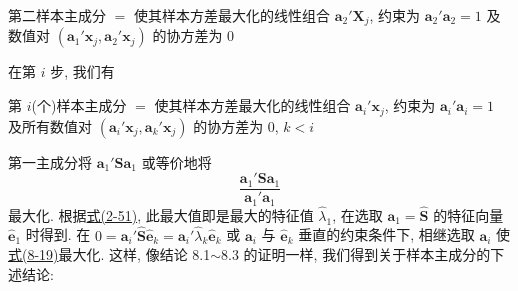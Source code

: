 第二样本主成分 $=$ 使其样本方差最大化的线性组合 $\mathbf{a}_2'\mathbf{X}_j$, 约束为 $\mathbf{a}_2'\mathbf{a}_2=1$ 及数值对 $(\mathbf{a}_1'\mathbf{x}_j,\mathbf{a}_2'\mathbf{x}_j)$ 的协方差为 0

在第 $i$ 步, 我们有

第 $i$(个)样本主成分 $=$ 使其样本方差最大化的线性组合 $\mathbf{a}_i'\mathbf{x}_j$, 约束为 $\mathbf{a}_i'\mathbf{a}_i=1$ 及所有数值对 $(\mathbf{a}_i'\mathbf{x}_j,\mathbf{a}_k'\mathbf{x}_j)$ 的协方差为 $0$, $k<i$

第一主成分将 $\mathbf{a}_1'\mathbf{S}\mathbf{a}_1$ 或等价地将
\label{eq:8-19}
\begin{equation}
\frac{\mathbf{a}_1'\mathbf{S}\mathbf{a}_1}{\mathbf{a}_1'\mathbf{a}_1}
\tag{8-19}
\end{equation}
最大化. 根据\hyperref[eq:2-51]{式(2-51)}, 此最大值即是最大的特征值 $\hat{\lambda}_1$, 在选取 $\mathbf{a}_1=\hat{\mathbf{S}}$ 的特征向量 $\hat{\mathbf{e}}_1$ 时得到. 在 $0=\mathbf{a}_i'\hat{\mathbf{S}}\hat{\mathbf{e}}_k=\mathbf{a}_i'\hat{\lambda}_k\hat{\mathbf{e}}_k$ 或 $\mathbf{a}_i$ 与 $\hat{\mathbf{e}}_k$ 垂直的约束条件下, 相继选取 $\mathbf{a}_i$ 使\hyperref[eq:8-19]{式(8-19)}最大化. 这样, 像结论 8.1$\sim$8.3 的证明一样, 我们得到关于样本主成分的下述结论:
